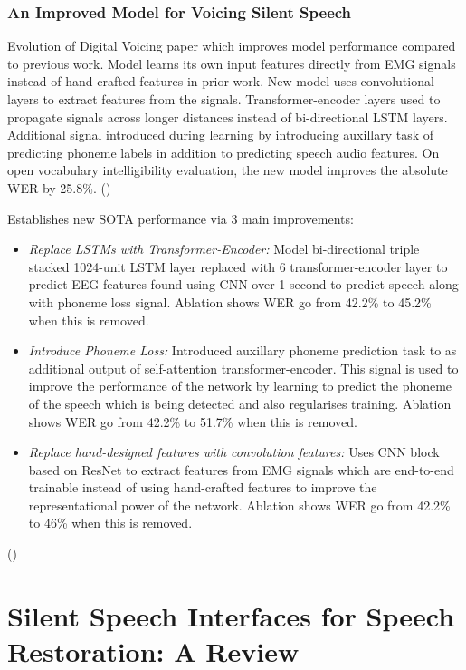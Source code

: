 \subsubsection{An Improved Model for Voicing Silent Speech}

Evolution of Digital Voicing paper which improves model performance compared to previous work.
Model learns its own input features directly from EMG signals instead of hand-crafted features in prior work.
New model uses convolutional layers to extract features from the signals.
Transformer-encoder layers used to propagate signals across longer distances instead of bi-directional LSTM layers.
Additional signal introduced during learning by introducing auxillary task of predicting phoneme labels in addition to predicting speech audio features.
On open vocabulary intelligibility evaluation, the new model improves the absolute WER by 25.8\%.
(\cite{gaddy2021improved})

Establishes new SOTA performance via 3 main improvements:

\begin{itemize}
  \item \emph{Replace LSTMs with Transformer-Encoder:}
  Model bi-directional triple stacked 1024-unit LSTM layer replaced with 6 transformer-encoder
  layer to predict EEG features found using CNN over 1 second to predict speech along with
  phoneme loss signal.
  Ablation shows WER go from 42.2\% to 45.2\% when this is removed.
  \item \emph{Introduce Phoneme Loss:}
  Introduced auxillary phoneme prediction task to as additional 
  output of self-attention transformer-encoder. This signal is used to improve the performance
  of the network by learning to predict the phoneme of the speech which is being detected and
  also regularises training.
  Ablation shows WER go from 42.2\% to 51.7\% when this is removed.
  \item \emph{Replace hand-designed features with convolution features:}
  Uses CNN block based on ResNet to extract features from EMG signals which are end-to-end
  trainable instead of using hand-crafted features to improve the representational power of the network.
  Ablation shows WER go from 42.2\% to 46\% when this is removed.
\end{itemize}

(\cite{gaddy2021improved})

\section{Silent Speech Interfaces for Speech Restoration: A Review}

